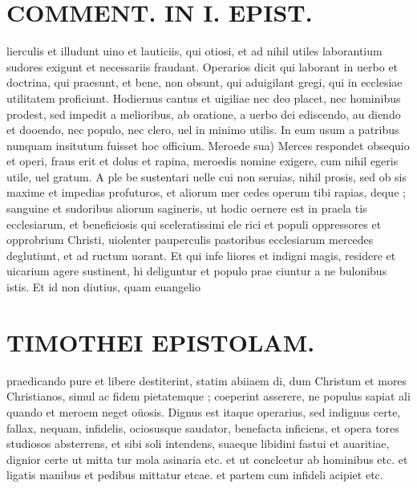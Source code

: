\documentclass{article}
\begin{document}
\begin{pages}
\section*{COMMENT. IN I. EPIST. }
\marginpar{[ p.140 ]}\pstart lierculis et illudunt uino et lauticiis, qui otiosi, et ad nihil utiles laborantium sudores exigunt et necessariis fraudant. Operarios dicit qui laborant in uerbo et doctrina, qui praesunt, et bene, non obsunt, qui aduigilant gregi, qui in ecclesiae utilitatem proficiunt. Hodiernus cantus et uigiliae nec deo placet, nec hominibus prodest, sed impedit a melioribus, ab oratione, a uerbo dei ediscendo, au diendo et dooendo, nec populo, nec clero, uel in minimo utilis. In eum usum a patribus nunquam insitutum fuisset hoc officium.  \pend\pstart Meroede sua) Merces respondet obsequio et operi, fraus erit et dolus et rapina, meroedis nomine exigere, cum nihil egeris utile, uel gratum. A ple be sustentari uelle cui non seruias, nihil prosis, sed ob sis maxime et impedias profuturos, et aliorum mer cedes operum tibi rapias, deque ; sanguine et sudoribus aliorum sagineris, ut hodic oernere est in praela tis ecclesiarum, et beneficiosis qui sceleratissimi ele rici et populi oppressores et opprobrium Christi, uiolenter pauperculis pastoribus ecclesiarum mercedes deglutiunt, et ad ructum uorant. Et qui infe liiores et indigni magis, residere et uicarium agere sustinent, hi deliguntur et populo prae ciuntur a ne bulonibus istis. Et id non diutius, quam euangelio  \pend
\section*{TIMOTHEI EPISTOLAM. }
\marginpar{[ p.141 ]}\pstart praedicando pure et libere destiterint, statim abiiaem di, dum Christum et mores Christianos, simul ac fidem pietatemque ; coeperint asserere, ne populus sapiat ali quando et meroem neget oüosis. Dignus est itaque operarius, sed indignus certe, fallax, nequam, infidelis, ociosusque saudator, benefacta inficiens, et opera tores studiosos absterrens, et sibi soli intendens, suaeque libidini fastui et auaritiae, dignior certe ut mitta tur mola asinaria etc. et ut conclcetur ab hominibus etc. et ligatis manibus et pedibus mittatur etcae. et partem cum infideli acipiet etc.  \pend
{}
{}

\end{pages}
\end{document}

